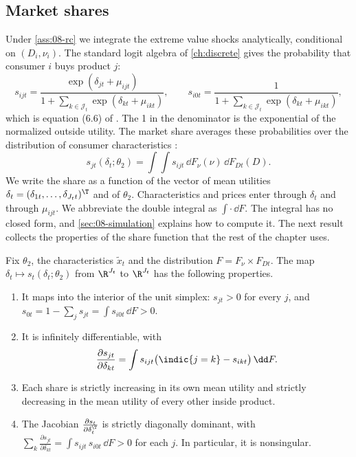 \subsection{Market shares}\label{sec:08-shares}

Under \cref{ass:08-rc} we integrate the extreme value shocks analytically, conditional on $(D_i, \nu_i)$. The
standard logit algebra of \cref{ch:discrete} gives the probability that consumer $i$ buys product $j$:
\begin{equation}\label{eq:08-individual-share}
  s_{ijt} = \frac{\exp(\delta_{jt} + \mu_{ijt})}{1 + \sum_{k \in \mathcal{J}_t}\exp(\delta_{kt} + \mu_{ikt})},
  \qquad
  s_{i0t} = \frac{1}{1 + \sum_{k \in \mathcal{J}_t}\exp(\delta_{kt} + \mu_{ikt})},
\end{equation}
which is equation (6.6) of \citet{BerryLevinsohnPakes1995}. The 1 in the denominator is the exponential of the
normalized outside utility. The market share averages these probabilities over the distribution of consumer
characteristics \citep[eq.~(6.7)]{BerryLevinsohnPakes1995}:
\begin{equation}\label{eq:08-share-integral}
  s_{jt}(\delta_t; \theta_2) = \int\!\!\int s_{ijt}\, \dd F_\nu(\nu)\, \dd F_{Dt}(D).
\end{equation}
We write the share as a function of the vector of mean utilities $\delta_t = (\delta_{1t}, \dots,
\delta_{J_t t})^\T$ and of $\theta_2$. Characteristics and prices enter through $\delta_t$ and through
$\mu_{ijt}$. We abbreviate the double integral as $\int \cdot \, \dd F$. The integral has no closed form, and
\cref{sec:08-simulation} explains how to compute it. The next result collects the properties of the share
function that the rest of the chapter uses.

\begin{proposition}\label{prop:08-shares}
Fix $\theta_2$, the characteristics $\tilde x_t$ and the distribution $F = F_\nu \times F_{Dt}$. The map
$\delta_t \mapsto s_t(\delta_t; \theta_2)$ from $\R^{J_t}$ to $\R^{J_t}$ has the following properties.
\begin{enumerate}[label=(\roman*)]
  \item It maps into the interior of the unit simplex: $s_{jt} > 0$ for every $j$, and
    $s_{0t} = 1 - \sum_{j} s_{jt} = \int s_{i0t}\, \dd F > 0$.
  \item It is infinitely differentiable, with
    \begin{equation}\label{eq:08-dsddelta}
      \frac{\partial s_{jt}}{\partial \delta_{kt}} = \int s_{ijt}\bigl(\indic\{j = k\} - s_{ikt}\bigr)\, \dd F.
    \end{equation}
  \item Each share is strictly increasing in its own mean utility and strictly decreasing in the mean utility
    of every other inside product.
  \item The Jacobian $\frac{\partial s_t}{\partial \delta_t^\T}$ is strictly diagonally dominant, with
    $\sum_{k} \frac{\partial s_{jt}}{\partial \delta_{kt}} = \int s_{ijt}\, s_{i0t}\, \dd F > 0$ for each $j$.
    In particular, it is nonsingular.
\end{enumerate}
\end{proposition}

